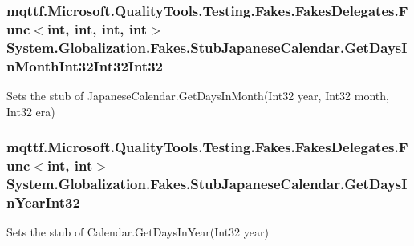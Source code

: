 \hypertarget{class_system_1_1_globalization_1_1_fakes_1_1_stub_japanese_calendar_accf22352e11a4b6a60444c56f2e51851}{
\subsubsection[{Get\-Days\-In\-Month\-Int32\-Int32\-Int32}]{\setlength{\rightskip}{0pt plus 5cm}mqttf.\-Microsoft.\-Quality\-Tools.\-Testing.\-Fakes.\-Fakes\-Delegates.\-Func$<$int, int, int, int$>$ System.\-Globalization.\-Fakes.\-Stub\-Japanese\-Calendar.\-Get\-Days\-In\-Month\-Int32\-Int32\-Int32}}\label{class_system_1_1_globalization_1_1_fakes_1_1_stub_japanese_calendar_accf22352e11a4b6a60444c56f2e51851}


Sets the stub of Japanese\-Calendar.\-Get\-Days\-In\-Month(\-Int32 year, Int32 month, Int32 era)

\hypertarget{class_system_1_1_globalization_1_1_fakes_1_1_stub_japanese_calendar_a8fc2f4f10069b2915933d06e03fe072d}{
\subsubsection[{Get\-Days\-In\-Year\-Int32}]{\setlength{\rightskip}{0pt plus 5cm}mqttf.\-Microsoft.\-Quality\-Tools.\-Testing.\-Fakes.\-Fakes\-Delegates.\-Func$<$int, int$>$ System.\-Globalization.\-Fakes.\-Stub\-Japanese\-Calendar.\-Get\-Days\-In\-Year\-Int32}}\label{class_system_1_1_globalization_1_1_fakes_1_1_stub_japanese_calendar_a8fc2f4f10069b2915933d06e03fe072d}


Sets the stub of Calendar.\-Get\-Days\-In\-Year(\-Int32 year)

